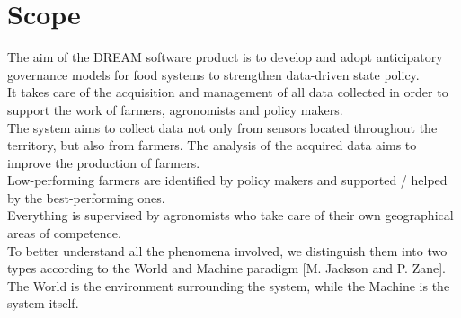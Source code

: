 \section{Scope}

The aim of the DREAM software product is to develop and adopt anticipatory governance models for food systems to strengthen data-driven state policy. \\
It takes care of the acquisition and management of all data collected in order to support the work of farmers, agronomists and policy makers.\\
The system aims to collect data not only from sensors located throughout the territory, but also from farmers. The analysis of the acquired data aims to improve the production of farmers.\\ Low-performing farmers are identified by policy makers and supported / helped by the best-performing ones.\\
Everything is supervised by agronomists who take care of their own geographical areas of competence.\\

To better understand all the phenomena involved, we distinguish them into two types according to the World and Machine paradigm [M. Jackson and P. Zane]. The World is the environment surrounding the system, while the Machine is the system itself.


